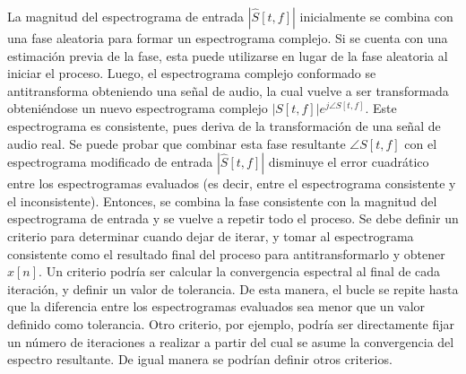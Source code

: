 La magnitud del espectrograma de entrada $\left | \hat{S}[t,f] \right |$ inicialmente se combina con una fase aleatoria para formar un espectrograma complejo. Si se cuenta con una estimación previa de la fase, esta puede utilizarse en lugar de la fase aleatoria al iniciar el proceso. Luego, el espectrograma complejo conformado se antitransforma obteniendo una señal de audio, la cual vuelve a ser transformada obteniéndose un nuevo espectrograma complejo $\left | S[t,f] \right |e^{j\angle S[t,f]}$. Este espectrograma es consistente, pues deriva de la transformación de una señal de audio real. Se puede probar que combinar esta fase resultante $\angle S[t,f]$ con el espectrograma modificado de entrada $\left | \hat{S}[t,f] \right |$ disminuye el error cuadrático entre los espectrogramas evaluados (es decir, entre el espectrograma consistente y el inconsistente). Entonces, se combina la fase consistente con la magnitud del espectrograma de entrada y se vuelve a repetir todo el proceso.   Se debe definir un criterio para determinar cuando dejar de iterar, y tomar al espectrograma consistente como el resultado final del proceso para antitransformarlo y obtener  $\hat{x}[n]$. Un criterio podría ser calcular la convergencia espectral al final de cada iteración, y definir un valor de tolerancia. De esta manera, el bucle se repite hasta que la diferencia entre los espectrogramas evaluados sea menor que un valor definido como tolerancia. Otro criterio, por ejemplo, podría ser directamente fijar un número de iteraciones a realizar a partir del cual se asume la convergencia del espectro resultante. De igual manera se podrían definir otros criterios. 

